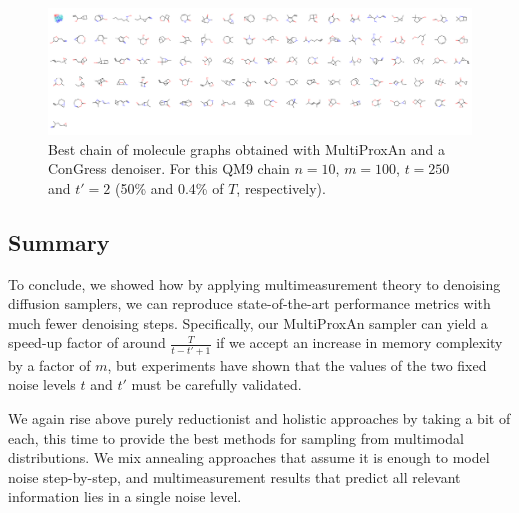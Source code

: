 \begin{figure}[H]
    \centering
    \includegraphics[width=\linewidth]{figures/multiprox/qm9_grid_image.png}
    \caption[Best chain of molecule graphs obtained with MultiProxAn.]{Best chain of molecule graphs obtained with MultiProxAn and a ConGress denoiser. For this QM9 chain $n=10$, $m=100$, $t=250$ and $t'=2$ (50\% and 0.4\% of $T$, respectively).
    }
    \label{fig:qm9_better}
\end{figure}

\subsection{Summary}

To conclude, we showed how by applying multimeasurement theory to denoising diffusion samplers, we can reproduce state-of-the-art performance metrics with much fewer denoising steps. Specifically, our MultiProxAn sampler can yield a speed-up factor of around $\frac{T}{t-t'+1}$ if we accept an increase in memory complexity by a factor of $m$, but experiments have shown that the values of the two fixed noise levels $t$ and $t'$ must be carefully validated. 

We again rise above purely reductionist and holistic approaches by taking a bit of each, this time to provide the best methods for sampling from multimodal distributions. We mix annealing approaches that assume it is enough to model noise step-by-step, and multimeasurement results that predict all relevant information lies in a single noise level. 
